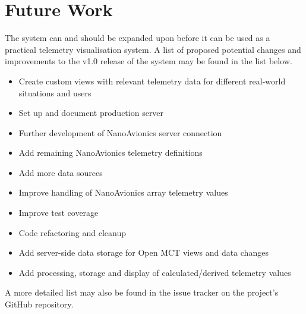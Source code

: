 \begin{comment}
Adding more inputs to the system, such as UAVs/autonaut/etc.

Adding custom visualizations

Add image/data output from imager
\end{comment}

\section{Future Work}

The system can and should be expanded upon before it can be used as a practical telemetry visualisation system. A list of proposed potential changes and improvements to the v1.0 release of the system may be found in the list below.

\begin{itemize}
  \item Create custom views with relevant telemetry data for different real-world situations and users
  \item Set up and document production server
  \item Further development of NanoAvionics server connection
  \item Add remaining NanoAvionics telemetry definitions
  \item Add more data sources
  \item Improve handling of NanoAvionics array telemetry values
  \item Improve test coverage
  \item Code refactoring and cleanup
  \item Add server-side data storage for Open MCT views and data changes
  \item Add processing, storage and display of calculated/derived telemetry values
\end{itemize}

A more detailed list may also be found in the issue tracker on the project's GitHub repository.